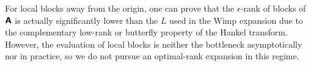 \begin{remark}
    For local blocks away from the origin, one can prove that the
    $\epsilon$-rank of blocks of $\bm{\mathsf{A}}$ is actually significantly lower than
    the $L$ used in the Wimp expansion due to the complementary low-rank or
    butterfly property of the Hankel transform. However, the evaluation of local
    blocks is neither the bottleneck asymptotically nor in practice, so we do
    not pursue an optimal-rank expansion in this regime.
\end{remark}